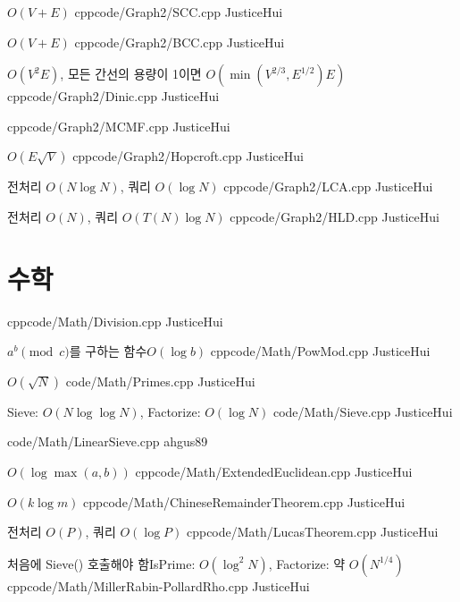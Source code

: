 \documentclass[landscape, 8pt, a4paper, twocolumn]{extarticle} %
\begin{document}
{}{$O(V+E)$}
{cpp}{code/Graph2/SCC.cpp}
{JusticeHui}

{}{$O(V+E)$}
{cpp}{code/Graph2/BCC.cpp}
{JusticeHui}

{}{$O(V^2E)$, 모든 간선의 용량이 1이면 $O(\min(V^{2/3},E^{1/2})E)$}
{cpp}{code/Graph2/Dinic.cpp}
{JusticeHui}

{}{}
{cpp}{code/Graph2/MCMF.cpp}
{JusticeHui}

{}{$O(E \sqrt V)$}
{cpp}{code/Graph2/Hopcroft.cpp}
{JusticeHui}

{}{전처리 $O(N \log N)$, 쿼리 $O(\log N)$}
{cpp}{code/Graph2/LCA.cpp}
{JusticeHui}

{}{전처리 $O(N)$, 쿼리 $O(T(N) \log N)$}
{cpp}{code/Graph2/HLD.cpp}
{JusticeHui}

\section{수학}

{}{}
{cpp}{code/Math/Division.cpp}
{JusticeHui}

{$a^b \pmod c$를 구하는 함수}{$O(\log b)$}
{cpp}{code/Math/PowMod.cpp}
{JusticeHui}

{}{$O(\sqrt N)$}
{}{code/Math/Primes.cpp}
{JusticeHui}

{}{Sieve: $O(N \log \log N)$, Factorize: $O(\log N)$}
{}{code/Math/Sieve.cpp}
{JusticeHui}

{}{}
{}{code/Math/LinearSieve.cpp}
{ahgus89}

{}{$O(\log \max(a,b))$}
{cpp}{code/Math/ExtendedEuclidean.cpp}
{JusticeHui}

{}{$O(k \log m)$}
{cpp}{code/Math/ChineseRemainderTheorem.cpp}
{JusticeHui}

{}{전처리 $O(P)$, 쿼리 $O(\log P)$}
{cpp}{code/Math/LucasTheorem.cpp}
{JusticeHui}

{처음에 Sieve() 호출해야 함}{IsPrime: $O(\log^2 N)$, Factorize: 약 $O(N^{1/4})$}
{cpp}{code/Math/MillerRabin-PollardRho.cpp}
{JusticeHui}
\end{document}
